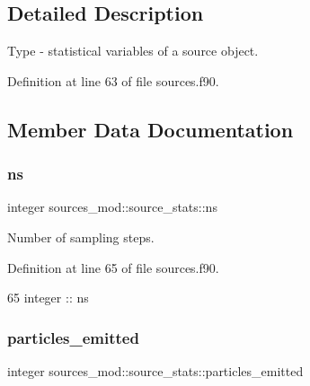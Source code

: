 \subsection{Detailed Description}
Type -\/ statistical variables of a source object. 

Definition at line 63 of file sources.\+f90.



\subsection{Member Data Documentation}
\mbox{\label{structsources__mod_1_1source__stats_a77ba33fcefa55c8d8e440844ee7f4640}} 
\subsubsection{\texorpdfstring{ns}{ns}}
{\footnotesize\ttfamily integer sources\+\_\+mod\+::source\+\_\+stats\+::ns\hspace{0.3cm}{\ttfamily [private]}}



Number of sampling steps. 



Definition at line 65 of file sources.\+f90.


\begin{DoxyCode}
65         \textcolor{keywordtype}{integer} :: ns
\end{DoxyCode}
\mbox{\label{structsources__mod_1_1source__stats_a2253ced036ad1a9fee933b6b08135189}} 
\subsubsection{\texorpdfstring{particles\+\_\+emitted}{particles\_emitted}}
{\footnotesize\ttfamily integer sources\+\_\+mod\+::source\+\_\+stats\+::particles\+\_\+emitted\hspace{0.3cm}{\ttfamily [private]}}



